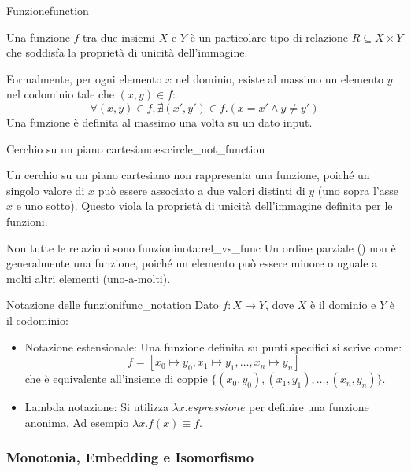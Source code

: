 \begin{definizione}{Funzione}{function}

Una funzione $f$ tra due insiemi $X$ e $Y$ è un particolare tipo di
relazione $R \subseteq X \times Y$ che soddisfa la proprietà di
unicità dell'immagine.

Formalmente, per ogni elemento $x$ nel dominio, esiste al massimo un
elemento $y$ nel codominio tale che $(x,y) \in f$:
\[
\forall (x, y) \in f, \nexists (x', y') \in f . (x = x' \land y \neq y')
\]
Una funzione è definita al massimo una volta su un dato input.
\end{definizione}

\begin{esempio}{Cerchio su un piano cartesiano}{es:circle_not_function}

    Un cerchio su un piano cartesiano non rappresenta una funzione, poiché
    un singolo valore di $x$ può essere associato a due valori distinti di
    $y$ (uno sopra l'asse $x$ e uno sotto). Questo viola la proprietà di
    unicità dell'immagine definita per le funzioni.

\end{esempio}

\begin{nota}{Non tutte le relazioni sono funzioni}{nota:rel_vs_func}
Un ordine parziale () non è generalmente una funzione,
poiché un elemento può essere minore o uguale a molti altri elementi
(uno-a-molti).
\end{nota}


\begin{definizione}{Notazione delle funzioni}{func_notation}
Dato $f: X \to Y$, dove $X$ è il dominio e $Y$ è il codominio:
\begin{itemize}
    \item Notazione estensionale: Una funzione definita su punti specifici si scrive come:
    \[ f = [x_0 \mapsto y_0, x_1 \mapsto y_1, \dots, x_n \mapsto y_n] \]
    che è equivalente all'insieme di coppie $\{(x_0, y_0), (x_1, y_1), \dots, (x_n, y_n)\}$.
    
    \item Lambda notazione: Si utilizza $\lambda x . \textit{espressione}$ per
    definire una funzione anonima. Ad esempio $\lambda x . f(x) \equiv f$.
\end{itemize}
\end{definizione}

\subsubsection{Monotonia, Embedding e Isomorfismo}


